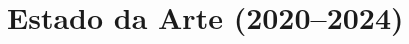 \documentclass[aspectratio=169]{beamer}
\begin{document}

\section{Estado da Arte (2020--2024)}
\end{document}
